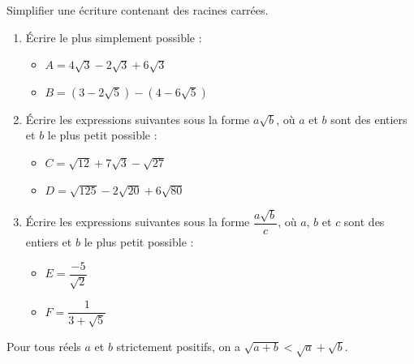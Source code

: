 \newpage

\begin{Méthode}Simplifier une écriture contenant des racines carrées. \\

\begin{enumerate}
\item Écrire le plus simplement possible : 
\begin{itemize}[label=\textcolor{Couleur3}{$\bullet$}]
\item $A=4\sqrt{3}-2\sqrt{3}+6\sqrt{3}$
\item $B=(3-2\sqrt{5})-(4-6\sqrt{5})$
\end{itemize}


\item Écrire les expressions suivantes sous la forme $a\sqrt{b}$, où $a$ et $b$ sont des entiers et $b$ le plus petit possible :
\begin{itemize}[label=\textcolor{Couleur3}{$\bullet$}]
\item $C=\sqrt{12}+7\sqrt{3}-\sqrt{27}$
\item $D=\sqrt{125}-2\sqrt{20}+6\sqrt{80}$
\end{itemize}
\item Écrire les expressions suivantes sous la forme $\dfrac{a\sqrt{b}}{c}$, où $a$, $b$ et $c$ sont des entiers et $b$ le plus petit possible :
\begin{itemize}[label=\textcolor{Couleur3}{$\bullet$}]

\item $E=\dfrac{-5}{\sqrt{2}}$
\item $F=\dfrac{1}{3+\sqrt{5}}$

\end{itemize}
\end{enumerate}
\vspace{0.2cm}

\ligne

\ligne

\ligne

\ligne

\ligne

\ligne

\ligne

\ligne

\end{Méthode}

\begin{Propriété}
Pour tous réels $a$ et $b$ strictement positifs, on a $\sqrt{a+b} < \sqrt{a} +\sqrt{b}$.

\end{Propriété}

